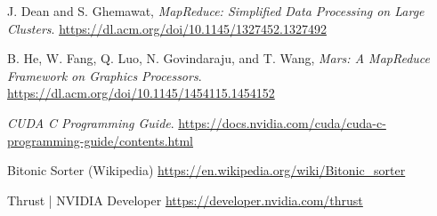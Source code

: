 \documentclass{article}
\begin{document}
\begin{thebibliography}
\raggedleft

J. Dean and S. Ghemawat, \textit{MapReduce: Simplified Data Processing on Large Clusters}. \href{https://dl.acm.org/doi/10.1145/1327452.1327492}{https://dl.acm.org/doi/10.1145/1327452.1327492}

B. He, W. Fang, Q. Luo, N. Govindaraju, and T. Wang, \textit{Mars: A MapReduce Framework on Graphics Processors}. \href{https://dl.acm.org/doi/10.1145/1454115.1454152}{https://dl.acm.org/doi/10.1145/1454115.1454152}

\textit{CUDA C Programming Guide}. \href{https://docs.nvidia.com/cuda/cuda-c-programming-guide/contents.html}{https://docs.nvidia.com/cuda/cuda-c-programming-guide/contents.html}

Bitonic Sorter (Wikipedia) \href{https://en.wikipedia.org/wiki/Bitonic_sorter}{https://en.wikipedia.org/wiki/Bitonic\_sorter}

Thrust | NVIDIA Developer \href{https://developer.nvidia.com/thrust}{https://developer.nvidia.com/thrust}

\end{thebibliography}
\end{document}
